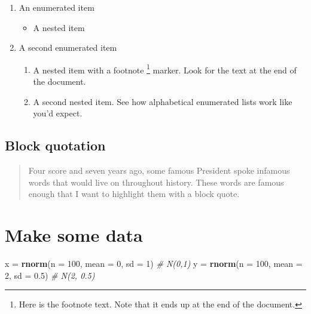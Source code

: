\documentclass[]{article}
\newenvironment{Shaded}{\begin{snugshade}}{\end{snugshade}}
\newcommand{\CommentTok}[1]{\textcolor[rgb]{0.56,0.35,0.01}{\textit{#1}}}
\newcommand{\DataTypeTok}[1]{\textcolor[rgb]{0.13,0.29,0.53}{#1}}
\newcommand{\DecValTok}[1]{\textcolor[rgb]{0.00,0.00,0.81}{#1}}
\newcommand{\FloatTok}[1]{\textcolor[rgb]{0.00,0.00,0.81}{#1}}
\newcommand{\KeywordTok}[1]{\textcolor[rgb]{0.13,0.29,0.53}{\textbf{#1}}}
\newcommand{\NormalTok}[1]{#1}
\newcommand{\StringTok}[1]{\textcolor[rgb]{0.31,0.60,0.02}{#1}}
\providecommand{\tightlist}{%
  \setlength{\itemsep}{0pt}\setlength{\parskip}{0pt}}
\begin{document}
\begin{enumerate}
\def\labelenumi{\arabic{enumi}.}
\tightlist
\item
  An enumerated item

  \begin{itemize}
  \tightlist
  \item
    A nested item
  \end{itemize}
\item
  A second enumerated item

  \begin{enumerate}
  \def\labelenumii{\alph{enumii}.}
  \tightlist
  \item
    A nested item with a footnote \footnote{Here is the footnote text.
      Note that it ends up at the end of the document.} marker. Look for
    the text at the end of the document.
  \item
    A second nested item. See how alphabetical enumerated lists work
    like you'd expect.
  \end{enumerate}
\end{enumerate}

\hypertarget{block-quotation}{%
\subsection{Block quotation}\label{block-quotation}}

\begin{quote}
Four score and seven years ago, some famous President spoke infamous
words that would live on throughout history. These words are famous
enough that I want to highlight them with a block quote.
\end{quote}

\hypertarget{make-some-data}{%
\section{Make some data}\label{make-some-data}}

\begin{Shaded}
\begin{Highlighting}[]
\NormalTok{x =}\StringTok{ }\KeywordTok{rnorm}\NormalTok{(}\DataTypeTok{n =} \DecValTok{100}\NormalTok{, }\DataTypeTok{mean =} \DecValTok{0}\NormalTok{, }\DataTypeTok{sd =} \DecValTok{1}\NormalTok{)   }\CommentTok{# N(0,1)}
\NormalTok{y =}\StringTok{ }\KeywordTok{rnorm}\NormalTok{(}\DataTypeTok{n =} \DecValTok{100}\NormalTok{, }\DataTypeTok{mean =} \DecValTok{2}\NormalTok{, }\DataTypeTok{sd =} \FloatTok{0.5}\NormalTok{) }\CommentTok{# N(2, 0.5)}
\end{Highlighting}
\end{Shaded}
\end{document}
